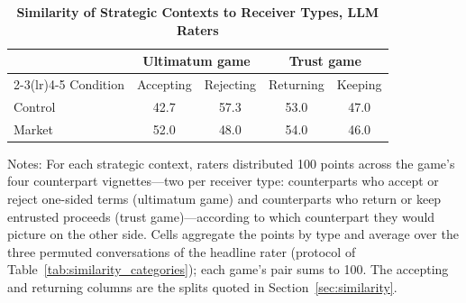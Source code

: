 \begin{table}[!htbp]
\centering
\footnotesize
\renewcommand{\arraystretch}{1.15}
\caption{\textbf{Similarity of Strategic Contexts to Receiver Types, LLM Raters}}
\label{tab:receiver_splits}
\begin{tabular}{l cc cc}
\toprule
& \multicolumn{2}{c}{Ultimatum game} & \multicolumn{2}{c}{Trust game} \\
\cmidrule(lr){2-3}\cmidrule(lr){4-5}
Condition & Accepting & Rejecting & Returning & Keeping \\
\midrule
Control & 42.7 & 57.3 & 53.0 & 47.0 \\
Market & 52.0 & 48.0 & 54.0 & 46.0 \\
\bottomrule
\end{tabular}
\begin{flushleft}
\footnotesize Notes: For each strategic context, raters distributed 100 points across the game's four counterpart vignettes---two per receiver type: counterparts who accept or reject one-sided terms (ultimatum game) and counterparts who return or keep entrusted proceeds (trust game)---according to which counterpart they would picture on the other side. Cells aggregate the points by type and average over the three permuted conversations of the headline rater (protocol of Table~\ref{tab:similarity_categories}); each game's pair sums to 100. The accepting and returning columns are the splits quoted in Section~\ref{sec:similarity}.
\end{flushleft}
\end{table}
